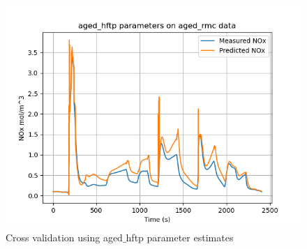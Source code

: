 \begin{figure}[H]
\begin{minipage}{0.33\textwidth}
                \includegraphics[width = \textwidth]{./figs/figs_new_mdl/aged_hftp_aged_rmc.png}
        \end{minipage}
        \caption{Cross validation using aged$\_$hftp parameter estimates}
\end{figure}

